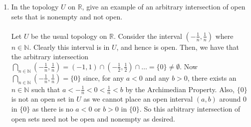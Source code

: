 \documentclass[12pt]{article}
\begin{document}
\begin{enumerate}
\item In the topology $U$ on $\mathbb{R}$, give an example of an arbitrary intersection of open sets that is nonempty and not open.\\\\
Let $U$ be the usual topology on $\mathbb{R}$. Consider the interval $(-\frac1n, \frac1n)$ where $n\in\mathbb{N}$. Clearly this interval is in $U$, and hence is open. Then, we have that the arbitrary intersection $\bigcap_{n\in\mathbb{N}}(-\frac1n, \frac1n)=(-1,1)\cap(-\frac12, \frac12)\cap\ldots=\{0\}\neq\emptyset$. Now $\bigcap_{n\in\mathbb{N}}(-\frac1n, \frac1n)=\{0\}$ since, for any $a<0$ and any $b>0$, there exists an $n\in\mathbb{N}$ such that $a<-\frac1n<0<\frac1n<b$ by the Archimedian Property. Also, $\{0\}$ is not an open set in $U$ as we cannot place an open interval $(a,b)$ around $0$ in $\{0\}$ as there is no $a<0$ or $b>0$ in $\{0\}$. So this arbitrary intersection of open sets need not be open and nonempty as desired.\\[20pt]


\end{enumerate}
\end{document}
